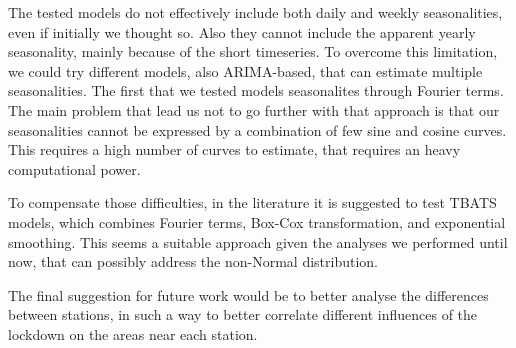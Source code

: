 \documentclass[12pt]{article}
\begin{document}
The tested models do not effectively include both daily and weekly seasonalities, even if initially we thought so. Also they cannot include the apparent yearly seasonality, mainly because of the short timeseries.
To overcome this limitation, we could try different models, also ARIMA-based, that can estimate multiple seasonalities. The first that we tested models seasonalites through Fourier terms. The main problem that lead us not to go further with that approach is that our seasonalities cannot be expressed by a combination of few sine and cosine curves. This requires a high number of curves to estimate, that requires an heavy computational power.

To compensate those difficulties, in the literature it is suggested to test TBATS models, which combines Fourier terms, Box-Cox transformation, and exponential smoothing. This seems a suitable approach given the analyses we performed until now, that can possibly address the non-Normal distribution.

The final suggestion for future work would be to better analyse the differences between stations, in such a way to better correlate different influences of the lockdown on the areas near each station.




\newpage

\end{document}
